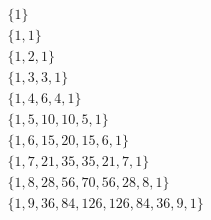 	$
\begin{array}{c}
\{1\} \\
\{1,1\} \\
\{1,2,1\} \\
\{1,3,3,1\} \\
\{1,4,6,4,1\} \\
\{1,5,10,10,5,1\} \\
\{1,6,15,20,15,6,1\} \\
\{1,7,21,35,35,21,7,1\} \\
\{1,8,28,56,70,56,28,8,1\} \\
\{1,9,36,84,126,126,84,36,9,1\} \\
\end{array}
$
